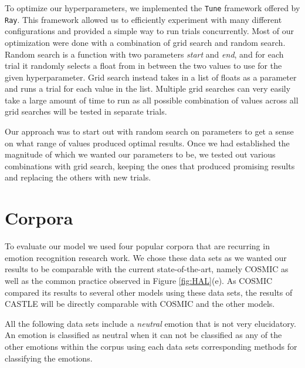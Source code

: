 \documentclass[nofilelist]{cslthse-msc}
\begin{document}
To optimize our hyperparameters, we implemented the \texttt{Tune} framework offered by \texttt{Ray}. This framework allowed us to efficiently experiment with many different configurations and provided a simple way to run trials concurrently. Most of our optimization were done with a combination of grid search and random search. Random search is a function with two parameters \textit{start} and \textit{end}, and for each trial it randomly selects a float from in between the two values to use for the given hyperparameter. Grid search instead takes in a list of floats as a parameter and runs a trial for each value in the list. Multiple grid searches can very easily take a large amount of time to run as all possible combination of values across all grid searches will be tested in separate trials. 

Our approach was to start out with random search on parameters to get a sense on what range of values produced optimal results. Once we had established the magnitude of which we wanted our parameters to be, we tested out various combinations with grid search, keeping the ones that produced promising results and replacing the others with new trials.

\section{Corpora}

To evaluate our model we used four popular corpora that are recurring in emotion recognition research work. We chose these data sets as we wanted our results to be comparable with the current state-of-the-art, namely COSMIC as well as the common practice observed in Figure \ref{fig:HAL}(e). As COSMIC compared its results to several other models using these data sets, the results of CASTLE will be directly comparable with COSMIC and the other models. 

All the following data sets include a \textit{neutral} emotion that is not very elucidatory. An emotion is classified as neutral when it can not be classified as any of the other emotions within the corpus using each data sets corresponding methods for classifying the emotions. 

\end{document}
